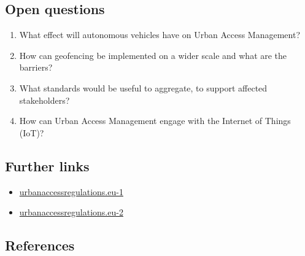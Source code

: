 \documentclass[
]{book}
\providecommand{\tightlist}{%
  \setlength{\itemsep}{0pt}\setlength{\parskip}{0pt}}
\begin{document}
\hypertarget{open-questions-5}{%
\subsection*{Open questions}\label{open-questions-5}}

\begin{enumerate}
\def\labelenumi{\arabic{enumi}.}
\tightlist
\item
  What effect will autonomous vehicles have on Urban Access Management?
\item
  How can geofencing be implemented on a wider scale and what are the barriers?
\item
  What standards would be useful to aggregate, to support affected stakeholders?
\item
  How can Urban Access Management engage with the Internet of Things (IoT)?
\end{enumerate}

\hypertarget{further-links-3}{%
\subsection*{Further links}\label{further-links-3}}

\begin{itemize}
\tightlist
\item
  \href{https://urbanaccessregulations.eu/urban-access-regulations/what-are-urban-access-regulations}{urbanaccessregulations.eu-1}
\item
  \href{https://urbanaccessregulations.eu/countries-mainmenu-147/austria-mainmenu-78/wien-vienna-emergency-scheme}{urbanaccessregulations.eu-2}
\end{itemize}

\hypertarget{references-5}{%
\subsection*{References}\label{references-5}}
\end{document}
